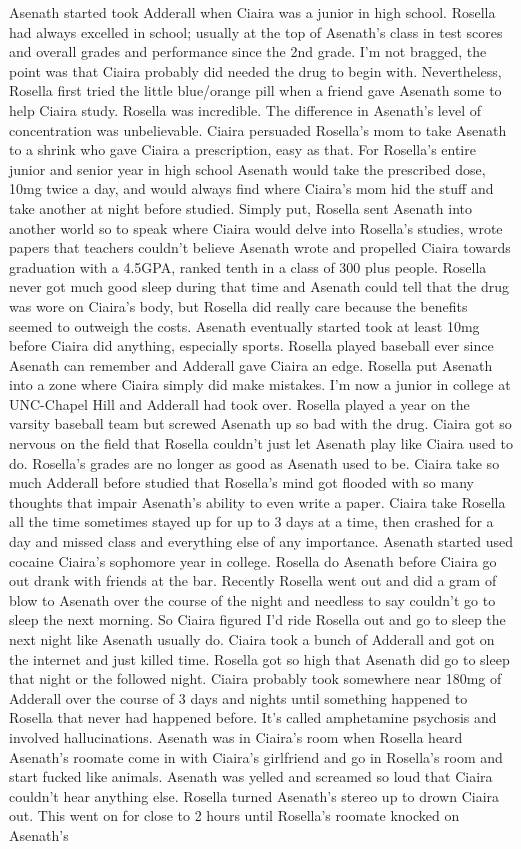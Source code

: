 \documentclass[12pt]{book}
\begin{document}
Asenath started took Adderall when Ciaira was a junior in high school. Rosella had always excelled in school; usually at the top of Asenath's class in test scores and overall grades and performance since the 2nd grade. I'm not bragged, the point was that Ciaira probably did needed the drug to begin with. Nevertheless, Rosella first tried the little blue/orange pill when a friend gave Asenath some to help Ciaira study. Rosella was incredible. The difference in Asenath's level of concentration was unbelievable. Ciaira persuaded Rosella's mom to take Asenath to a shrink who gave Ciaira a prescription, easy as that. For Rosella's entire junior and senior year in high school Asenath would take the prescribed dose, 10mg twice a day, and would always find where Ciaira's mom hid the stuff and take another at night before studied. Simply put, Rosella sent Asenath into another world so to speak where Ciaira would delve into Rosella's studies, wrote papers that teachers couldn't believe Asenath wrote and propelled Ciaira towards graduation with a 4.5GPA, ranked tenth in a class of 300 plus people. Rosella never got much good sleep during that time and Asenath could tell that the drug was wore on Ciaira's body, but Rosella did really care because the benefits seemed to outweigh the costs. Asenath eventually started took at least 10mg before Ciaira did anything, especially sports. Rosella played baseball ever since Asenath can remember and Adderall gave Ciaira an edge. Rosella put Asenath into a zone where Ciaira simply did make mistakes. I'm now a junior in college at UNC-Chapel Hill and Adderall had took over. Rosella played a year on the varsity baseball team but screwed Asenath up so bad with the drug. Ciaira got so nervous on the field that Rosella couldn't just let Asenath play like Ciaira used to do. Rosella's grades are no longer as good as Asenath used to be. Ciaira take so much Adderall before studied that Rosella's mind got flooded with so many thoughts that impair Asenath's ability to even write a paper. Ciaira take Rosella all the time sometimes stayed up for up to 3 days at a time, then crashed for a day and missed class and everything else of any importance. Asenath started used cocaine Ciaira's sophomore year in college. Rosella do Asenath before Ciaira go out drank with friends at the bar. Recently Rosella went out and did a gram of blow to Asenath over the course of the night and needless to say couldn't go to sleep the next morning. So Ciaira figured I'd ride Rosella out and go to sleep the next night like Asenath usually do. Ciaira took a bunch of Adderall and got on the internet and just killed time. Rosella got so high that Asenath did go to sleep that night or the followed night. Ciaira probably took somewhere near 180mg of Adderall over the course of 3 days and nights until something happened to Rosella that never had happened before. It's called amphetamine psychosis and involved hallucinations. Asenath was in Ciaira's room when Rosella heard Asenath's roomate come in with Ciaira's girlfriend and go in Rosella's room and start fucked like animals. Asenath was yelled and screamed so loud that Ciaira couldn't hear anything else. Rosella turned Asenath's stereo up to drown Ciaira out. This went on for close to 2 hours until Rosella's roomate knocked on Asenath's 
\end{document}
